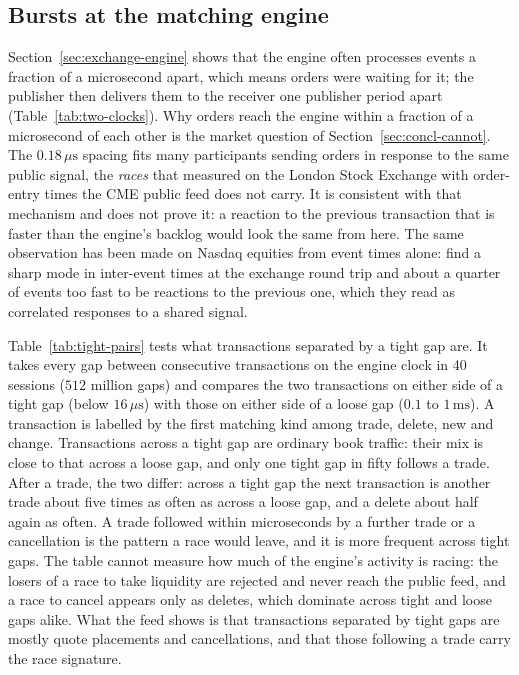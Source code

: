 \documentclass[11pt]{article}
\begin{document}
\subsection{Bursts at the matching engine}
\label{sec:exchange-bursts}

Section~\ref{sec:exchange-engine} shows that the engine often processes events a fraction
of a microsecond apart, which means orders were waiting for it; the publisher then
delivers them to the receiver one publisher period apart
(Table~\ref{tab:two-clocks}). Why orders reach the engine within a fraction of a
microsecond of each other is the market question of Section~\ref{sec:concl-cannot}. The $0.18\,\mu\mathrm{s}$
spacing fits many participants sending orders in response to the same public signal, the
\emph{races} that \citet{aquilina2022arms} measured on the London Stock Exchange with
order-entry times the CME public feed does not carry. It is consistent with that
mechanism and does not prove it: a reaction to the previous transaction that is faster than
the engine's backlog would look the same from here. The same observation has been made on
Nasdaq equities from event times alone: \citet{noble2026realitygap} find a sharp mode in
inter-event times at the exchange round trip and about a quarter of events too fast to be
reactions to the previous one, which they read as correlated responses to a shared
signal.

Table~\ref{tab:tight-pairs} tests what transactions separated by a tight gap are. It
takes every gap between consecutive transactions on the engine clock in 40 sessions
($512$ million gaps) and compares the two transactions on either side of a tight gap
(below $16\,\mu\mathrm{s}$) with those on either side of a loose gap ($0.1$ to
$1\,\mathrm{ms}$). A transaction is labelled by the first matching kind among trade,
delete, new and change. Transactions across a tight gap are ordinary book traffic: their
mix is close to that across a loose gap, and only one tight gap in fifty follows a trade.
After a trade, the two differ: across a tight gap the next transaction is another trade
about five times as often as across a loose gap, and a delete about half again as often. A trade followed within microseconds by a further trade
or a cancellation is the pattern a race would leave, and it is more frequent across tight
gaps.
The table cannot measure how much of the engine's activity is racing: the losers of a race
to take liquidity are rejected and never reach the public feed, and a race to cancel
appears only as deletes, which dominate across tight and loose gaps alike. What the feed
shows is that transactions separated by tight gaps are mostly quote placements and
cancellations, and that those following a trade carry the race signature.
\end{document}
